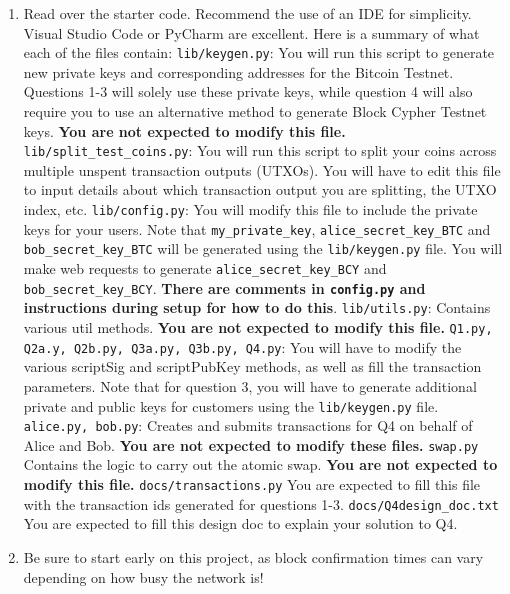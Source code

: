 \documentclass[11pt]{article}
\begin{document}
\begin{enumerate}
\item Read over the starter code. Recommend the use of an IDE for simplicity. Visual Studio Code or PyCharm are excellent.
Here is a summary of what each of the files contain:
    \subitem \texttt{lib/keygen.py}:
    \subitem You will run this script to generate new private keys and corresponding addresses for the Bitcoin Testnet. Questions 1-3 will solely use these private keys, while question 4 will also require you to use an alternative method to generate Block Cypher Testnet keys. \textbf{You are not expected to modify this file.}
    \vspace{0.3cm}
    \subitem \texttt{lib/split\_test\_coins.py}:
    \subitem You will run this script to split your coins across multiple unspent transaction outputs (UTXOs). You will have to edit this file to input details about which transaction output you are splitting, the UTXO index, etc.
    \vspace{0.3cm}
    \subitem \texttt{lib/config.py}:
    \subitem You will modify this file to include the private keys for your users. Note that \texttt{my\_private\_key}, \texttt{alice\_secret\_key\_BTC} and \texttt{bob\_secret\_key\_BTC} will be generated using the \texttt{lib/keygen.py} file. You will make web requests to generate \texttt{alice\_secret\_key\_BCY} and \texttt{bob\_secret\_key\_BCY}. \textbf{There are comments in \texttt{config.py} and instructions during setup for how to do this}.
    \vspace{0.3cm}
    \subitem \texttt{lib/utils.py}:
    \subitem Contains various util methods. \textbf{You are not expected to modify this file.}
    \vspace{0.3cm}
    \subitem \texttt{Q1.py, Q2a.y, Q2b.py, Q3a.py, Q3b.py, Q4.py}:
    \subitem You will have to modify the various scriptSig and scriptPubKey methods, as well as fill the transaction parameters. Note that for question 3, you will have to generate additional private and public keys for customers using the \texttt{lib/keygen.py} file.
    \vspace{0.3cm}
    \subitem \texttt{alice.py, bob.py}:
    \subitem Creates and submits transactions for Q4 on behalf of Alice and Bob. \textbf{You are not expected to modify these files.}
    \vspace{0.3cm}
    \subitem \texttt{swap.py}
    \subitem Contains the logic to carry out the atomic swap. \textbf{You are not expected to modify this file.}
    \vspace{0.3cm}
    \subitem \texttt{docs/transactions.py}
    \subitem You are expected to fill this file with the transaction ids generated for questions 1-3.
    \vspace{0.3cm}
    \subitem \texttt{docs/Q4design\_doc.txt}
    \subitem You are expected to fill this design doc to explain your solution to Q4.

\item Be sure to start early on this project, as block confirmation times can vary depending on how busy the network is!

\end{enumerate}
\end{document}
